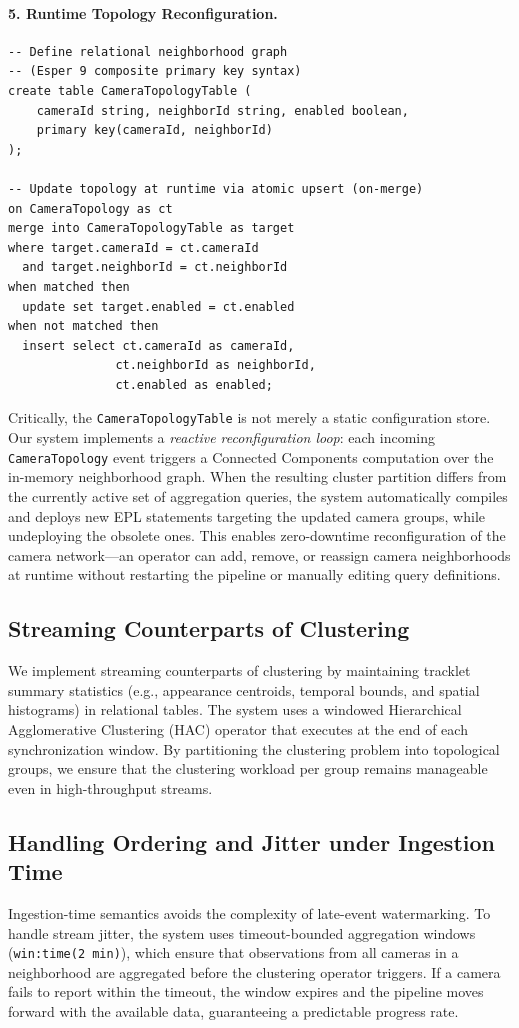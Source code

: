 \documentclass[11pt]{article}
\begin{document}
\paragraph{5. Runtime Topology Reconfiguration.}
\begin{verbatim}
-- Define relational neighborhood graph
-- (Esper 9 composite primary key syntax)
create table CameraTopologyTable (
    cameraId string, neighborId string, enabled boolean, 
    primary key(cameraId, neighborId)
);

-- Update topology at runtime via atomic upsert (on-merge)
on CameraTopology as ct
merge into CameraTopologyTable as target
where target.cameraId = ct.cameraId
  and target.neighborId = ct.neighborId
when matched then
  update set target.enabled = ct.enabled
when not matched then
  insert select ct.cameraId as cameraId,
               ct.neighborId as neighborId,
               ct.enabled as enabled;
\end{verbatim}

\noindent Critically, the \texttt{CameraTopologyTable} is not merely a static configuration store. Our system implements a \emph{reactive reconfiguration loop}: each incoming \texttt{CameraTopology} event triggers a Connected Components computation over the in-memory neighborhood graph. When the resulting cluster partition differs from the currently active set of aggregation queries, the system automatically compiles and deploys new EPL statements targeting the updated camera groups, while undeploying the obsolete ones. This enables zero-downtime reconfiguration of the camera network---an operator can add, remove, or reassign camera neighborhoods at runtime without restarting the pipeline or manually editing query definitions.


\subsection{Streaming Counterparts of Clustering}
We implement streaming counterparts of clustering by maintaining tracklet summary statistics (e.g., appearance centroids, temporal bounds, and spatial histograms) in relational tables. The system uses a windowed Hierarchical Agglomerative Clustering (HAC) operator that executes at the end of each synchronization window. By partitioning the clustering problem into topological groups, we ensure that the clustering workload per group remains manageable even in high-throughput streams.

\subsection{Handling Ordering and Jitter under Ingestion Time}
Ingestion-time semantics avoids the complexity of late-event watermarking. To handle stream jitter, the system uses timeout-bounded aggregation windows (\texttt{win:time(2 min)}), which ensure that observations from all cameras in a neighborhood are aggregated before the clustering operator triggers. If a camera fails to report within the timeout, the window expires and the pipeline moves forward with the available data, guaranteeing a predictable progress rate.
\end{document}
